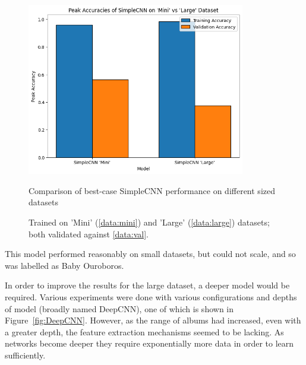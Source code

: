                 \begin{figure}[h]
                    \centering
                    \includegraphics[width=0.85\textwidth]{images/SimpleCNNs_PeakAccuracy.png}
                    \caption{Comparison of best-case SimpleCNN performance on different sized datasets}
                    \label{fig:SimpleCNNs_PeakAccuracy-Mini_Train}
                    \caption*{Trained on 'Mini' (\ref{data:mini}) and 'Large' (\ref{data:large}) datasets; both validated against \ref{data:val}.}
                \end{figure}
    
                This model performed reasonably on small datasets, but could not scale, and so was labelled as Baby Ouroboros.
    
                In order to improve the results for the large dataset, a deeper model would be required. Various experiments were done with various configurations and depths of model (broadly named DeepCNN), one of which is shown in Figure~\ref{fig:DeepCNN}. However, as the range of albums had increased, even with a greater depth, the feature extraction mechanisms seemed to be lacking. As networks become deeper they require exponentially more data in order to learn sufficiently.
    
